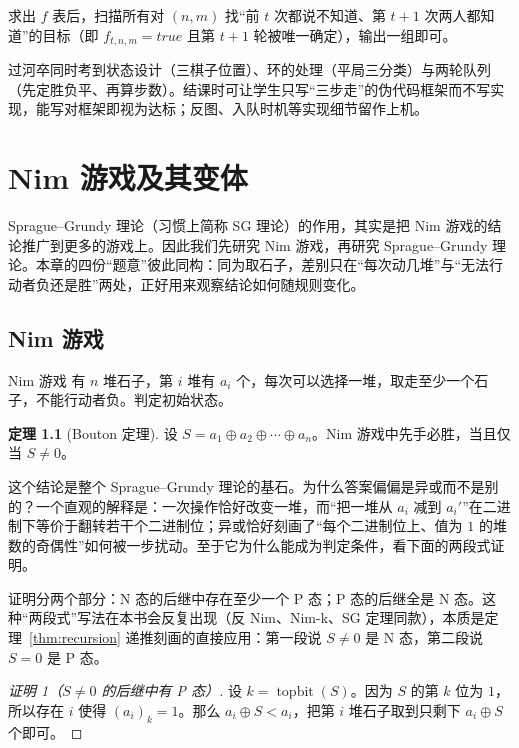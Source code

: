 \documentclass[UTF8,a4paper,11pt,oneside,openany,fontset=fandol]{ctexbook}
\theoremstyle{definition}
\newtheorem{theorem}[definition]{定理}
\newcommand{\topbit}{\operatorname{topbit}}
\begin{document}
求出 $f$ 表后，扫描所有对 $(n,m)$ 找“前 $t$ 次都说不知道、第 $t+1$ 次两人都知道”的目标（即 $f_{t,n,m}=true$ 且第 $t+1$ 轮被唯一确定），输出一组即可。

\begin{teach}[为何这道题适合作为状态图题的结课例]
过河卒同时考到状态设计（三棋子位置）、环的处理（平局三分类）与两轮队列（先定胜负平、再算步数）。结课时可让学生只写“三步走”的伪代码框架而不写实现，能写对框架即视为达标；反图、入队时机等实现细节留作上机。
\end{teach}
\chapter{Nim 游戏及其变体}
Sprague--Grundy 理论（习惯上简称 SG 理论）的作用，其实是把 Nim 游戏的结论推广到更多的游戏上。因此我们先研究 Nim 游戏，再研究 Sprague--Grundy 理论。本章的四份“题意”彼此同构：同为取石子，差别只在“每次动几堆”与“无法行动者负还是胜”两处，正好用来观察结论如何随规则变化。

\section{Nim 游戏}
\begin{problem}{Nim 游戏}
有 $n$ 堆石子，第 $i$ 堆有 $a_i$ 个，每次可以选择一堆，取走至少一个石子，不能行动者负。判定初始状态。
\end{problem}

\begin{theorem}[Bouton 定理]\label{thm:bouton}
设 $S=a_1\oplus a_2\oplus\cdots\oplus a_n$。Nim 游戏中先手必胜，当且仅当 $S\ne0$。
\end{theorem}

这个结论是整个 Sprague--Grundy 理论的基石。为什么答案偏偏是异或而不是别的？一个直观的解释是：一次操作恰好改变一堆，而“把一堆从 $a_i$ 减到 $a_i'$”在二进制下等价于翻转若干个二进制位；异或恰好刻画了“每个二进制位上、值为 $1$ 的堆数的奇偶性”如何被一步扰动。至于它为什么能成为判定条件，看下面的两段式证明。

证明分两个部分：N 态的后继中存在至少一个 P 态；P 态的后继全是 N 态。这种“两段式”写法在本书会反复出现（反 Nim、Nim-k、SG 定理同款），本质是定理~\ref{thm:recursion} 递推刻画的直接应用：第一段说 $S\ne0$ 是 N 态，第二段说 $S=0$ 是 P 态。

\begin{proof}[证明 1（$S\ne0$ 的后继中有 P 态）]
设 $k=\topbit(S)$。因为 $S$ 的第 $k$ 位为 $1$，所以存在 $i$ 使得 $(a_i)_k=1$。那么 $a_i\oplus S<a_i$，把第 $i$ 堆石子取到只剩下 $a_i\oplus S$ 个即可。
\end{proof}
\end{document}

